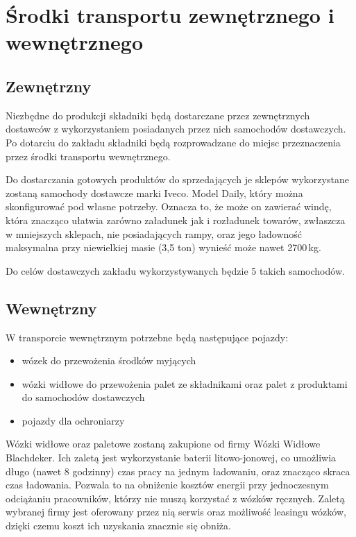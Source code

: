 \section{Środki transportu zewnętrznego i wewnętrznego}

\subsection{Zewnętrzny}

Niezbędne do produkcji składniki będą dostarczane przez zewnętrznych dostawców z wykorzystaniem posiadanych przez nich samochodów dostawczych. Po dotarciu do zakładu składniki będą rozprowadzane do miejsc przeznaczenia przez środki transportu wewnętrznego.\vspace{\baselineskip}

Do dostarczania gotowych produktów do sprzedających je sklepów wykorzystane zostaną samochody dostawcze marki \textsf{Iveco. Model Daily}, który można skonfigurować pod własne potrzeby. Oznacza to, że może on zawierać windę, która znacząco ułatwia zarówno załadunek jak i rozładunek towarów, zwłaszcza w mniejszych sklepach, nie posiadających rampy, oraz jego ładowność maksymalna przy niewielkiej masie (3,5 ton) wynieść może nawet 2700\,kg.

Do celów dostawczych zakładu wykorzystywanych będzie 5 takich samochodów.

\subsection{Wewnętrzny}

W transporcie wewnętrznym potrzebne będą następujące pojazdy:
\begin{itemize}
	\item wózek do przewożenia środków myjących
	\item wózki widłowe do przewożenia palet ze składnikami oraz palet z produktami do samochodów dostawczych
	\item pojazdy dla ochroniarzy
\end{itemize}

Wózki widłowe oraz paletowe zostaną zakupione od firmy \textsf{Wózki Widłowe Blachdeker}. Ich zaletą jest wykorzystanie baterii litowo-jonowej, co umożliwia długo (nawet 8 godzinny) czas pracy na jednym ładowaniu, oraz znacząco skraca czas ładowania. Pozwala to na obniżenie kosztów energii przy jednoczesnym odciążaniu pracowników, którzy nie muszą korzystać z wózków ręcznych. Zaletą wybranej firmy jest oferowany przez nią serwis oraz możliwość leasingu wózków, dzięki czemu koszt ich uzyskania znacznie się obniża.\vspace{\baselineskip}

